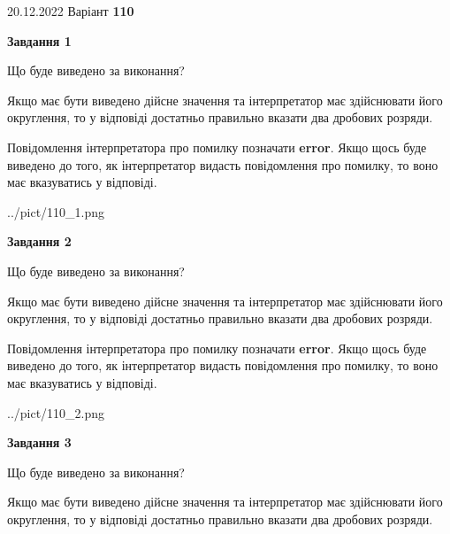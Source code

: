 \documentclass[12pt, ukrainian]{article}
\begin{document}
{20.12.2022 Варіант \No \textbf { 110 }\par}
{
\begin {Large}

{\begin {center}\textbf{Завдання 1}\end {center}}\par
Що буде виведено за виконання? \par

Якщо має бути виведено дійсне значення та інтерпретатор має здійснювати його округлення, 
то у відповіді достатньо правильно вказати два дробових розряди.

Повідомлення інтерпретатора про помилку позначати \textbf{error}.
Якщо щось буде виведено до того, як інтерпретатор видасть повідомлення про помилку, 
то воно має вказуватись у відповіді. \par

\begin{center}
	{../pict/110_1.png}
\end{center}
\newpage

{\begin {center}\textbf{Завдання 2}\end {center}}\par
Що буде виведено за виконання? \par

Якщо має бути виведено дійсне значення та інтерпретатор має здійснювати його округлення, 
то у відповіді достатньо правильно вказати два дробових розряди.

Повідомлення інтерпретатора про помилку позначати \textbf{error}.
Якщо щось буде виведено до того, як інтерпретатор видасть повідомлення про помилку, 
то воно має вказуватись у відповіді. \par

\begin{center}
	{../pict/110_2.png}
\end{center}
\newpage

{\begin {center}\textbf{Завдання 3}\end {center}}\par
Що буде виведено за виконання? \par

Якщо має бути виведено дійсне значення та інтерпретатор має здійснювати його округлення, 
то у відповіді достатньо правильно вказати два дробових розряди.


\end{Large}}
\end{document}
